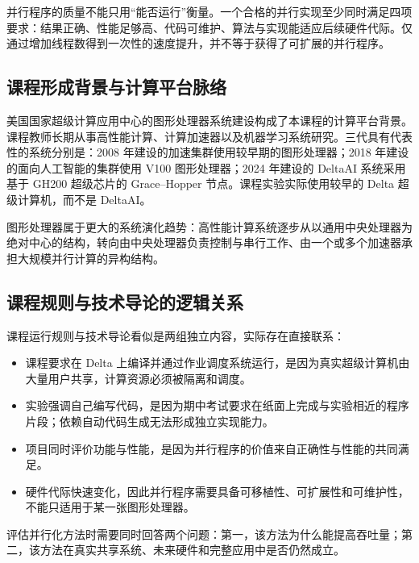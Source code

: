 \begin{keybox}
并行程序的质量不能只用“能否运行”衡量。一个合格的并行实现至少同时满足四项要求：结果正确、性能足够高、代码可维护、算法与实现能适应后续硬件代际。仅通过增加线程数得到一次性的速度提升，并不等于获得了可扩展的并行程序。
\end{keybox}

\subsection{课程形成背景与计算平台脉络}

美国国家超级计算应用中心的图形处理器系统建设构成了本课程的计算平台背景。课程教师长期从事高性能计算、计算加速器以及机器学习系统研究。三代具有代表性的系统分别是：2008 年建设的加速集群使用较早期的图形处理器；2018 年建设的面向人工智能的集群使用 V100 图形处理器；2024 年建设的 DeltaAI 系统采用基于 GH200 超级芯片的 Grace--Hopper 节点。课程实验实际使用较早的 Delta 超级计算机，而不是 DeltaAI。

图形处理器属于更大的系统演化趋势：高性能计算系统逐步从以通用中央处理器为绝对中心的结构，转向由中央处理器负责控制与串行工作、由一个或多个加速器承担大规模并行计算的异构结构。

\subsection{课程规则与技术导论的逻辑关系}

课程运行规则与技术导论看似是两组独立内容，实际存在直接联系：
\begin{itemize}
  \item 课程要求在 Delta 上编译并通过作业调度系统运行，是因为真实超级计算机由大量用户共享，计算资源必须被隔离和调度。
  \item 实验强调自己编写代码，是因为期中考试要求在纸面上完成与实验相近的程序片段；依赖自动代码生成无法形成独立实现能力。
  \item 项目同时评价功能与性能，是因为并行程序的价值来自正确性与性能的共同满足。
  \item 硬件代际快速变化，因此并行程序需要具备可移植性、可扩展性和可维护性，不能只适用于某一张图形处理器。
\end{itemize}

评估并行化方法时需要同时回答两个问题：第一，该方法为什么能提高吞吐量；第二，该方法在真实共享系统、未来硬件和完整应用中是否仍然成立。
